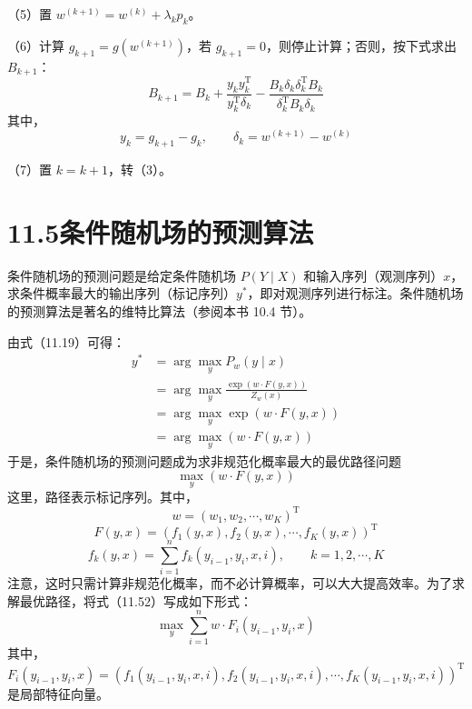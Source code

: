 \documentclass[UTF8,12pt,a4paper,fontset=fandol]{ctexart}
\begin{document}
（5）置 $w^{(k+1)}=w^{(k)}+\lambda_kp_k$。

（6）计算 $g_{k+1}=g(w^{(k+1)})$，若 $g_{k+1}=0$，则停止计算；否则，按下式求出 $B_{k+1}$：
\[
B_{k+1}=B_k+\frac{y_ky_k^{\mathrm T}}{y_k^{\mathrm T}\delta_k}
-\frac{B_k\delta_k\delta_k^{\mathrm T}B_k}{\delta_k^{\mathrm T}B_k\delta_k}
\]
其中，
\[
y_k=g_{k+1}-g_k,\qquad \delta_k=w^{(k+1)}-w^{(k)}
\]

（7）置 $k=k+1$，转（3）。

\section*{11.5\quad 条件随机场的预测算法}

条件随机场的预测问题是给定条件随机场 $P(Y\mid X)$ 和输入序列（观测序列）$x$，求条件概率最大的输出序列（标记序列）$y^*$，即对观测序列进行标注。条件随机场的预测算法是著名的维特比算法（参阅本书 10.4 节）。

由式（11.19）可得：
\begin{equation}
\begin{aligned}
y^*&=\arg\max_y P_w(y\mid x)\\
&=\arg\max_y\frac{\exp(w\cdot F(y,x))}{Z_w(x)}\\
&=\arg\max_y\exp(w\cdot F(y,x))\\
&=\arg\max_y(w\cdot F(y,x))
\end{aligned}
\tag{11.52}
\end{equation}
于是，条件随机场的预测问题成为求非规范化概率最大的最优路径问题
\[
\max_y(w\cdot F(y,x))
\]
这里，路径表示标记序列。其中，
\[
w=(w_1,w_2,\cdots,w_K)^{\mathrm T}
\]
\[
F(y,x)=(f_1(y,x),f_2(y,x),\cdots,f_K(y,x))^{\mathrm T}
\]
\[
f_k(y,x)=\sum_{i=1}^{n}f_k(y_{i-1},y_i,x,i),\qquad k=1,2,\cdots,K
\]
注意，这时只需计算非规范化概率，而不必计算概率，可以大大提高效率。为了求解最优路径，将式（11.52）写成如下形式：
\begin{equation}
\max_y\sum_{i=1}^{n}w\cdot F_i(y_{i-1},y_i,x)
\tag{11.53}
\end{equation}
其中，
\[
F_i(y_{i-1},y_i,x)=
(f_1(y_{i-1},y_i,x,i),f_2(y_{i-1},y_i,x,i),\cdots,f_K(y_{i-1},y_i,x,i))^{\mathrm T}
\]
是局部特征向量。
\end{document}
